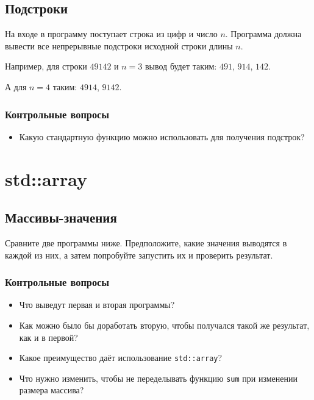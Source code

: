 \documentclass[10pt,twoside,openany]{book}
\begin{document}
\section{Подстроки}

На входе в программу поступает строка из цифр и число $n$. Программа должна вывести все
непрерывные подстроки исходной строки длины $n$.

Например, для строки $49142$ и $n=3$ вывод будет таким: $491$, $914$, $142$.

А для $n=4$ таким: $4914$, $9142$.

\subsection*{Контрольные вопросы}

\begin{itemize}
    \item Какую стандартную функцию можно использовать для получения подстрок?
\end{itemize}


\chapter{std::array}

\section{Массивы-значения}
\label{array-value}

Сравните две программы ниже. Предположите, какие значения выводятся в каждой из них,
а затем попробуйте запустить их и проверить результат.





\subsection*{Контрольные вопросы}

\begin{itemize}
    \item Что выведут первая и вторая программы?
    \item Как можно было бы доработать вторую, чтобы получался такой же результат, как и в первой?
    \item Какое преимущество даёт использование {\tt std::array}?
    \item Что нужно изменить, чтобы не переделывать функцию {\tt sum} при изменении размера массива?
\end{itemize}
\end{document}
